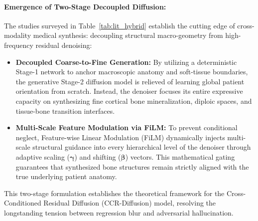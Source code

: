 \paragraph{Emergence of Two-Stage Decoupled Diffusion:}
The studies surveyed in Table~\ref{tab:lit_hybrid} establish the cutting edge of cross-modality medical synthesis: decoupling structural macro-geometry from high-frequency residual denoising:
\begin{itemize}
    \item \textbf{Decoupled Coarse-to-Fine Generation:} By utilizing a deterministic Stage-1 network to anchor macroscopic anatomy and soft-tissue boundaries, the generative Stage-2 diffusion model is relieved of learning global patient orientation from scratch. Instead, the denoiser focuses its entire expressive capacity on synthesizing fine cortical bone mineralization, diploic spaces, and tissue-bone transition interfaces.
    \item \textbf{Multi-Scale Feature Modulation via FiLM:} To prevent conditional neglect, Feature-wise Linear Modulation (FiLM) dynamically injects multi-scale structural guidance into every hierarchical level of the denoiser through adaptive scaling ($\boldsymbol{\gamma}$) and shifting ($\boldsymbol{\beta}$) vectors. This mathematical gating guarantees that synthesized bone structures remain strictly aligned with the true underlying patient anatomy.
\end{itemize}
This two-stage formulation establishes the theoretical framework for the Cross-Conditioned Residual Diffusion (CCR-Diffusion) model, resolving the longstanding tension between regression blur and adversarial hallucination.

\vspace{10pt}
